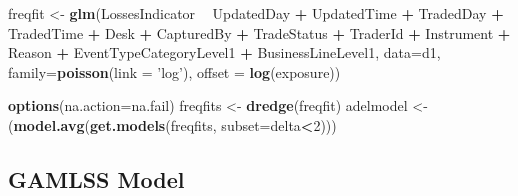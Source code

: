 \documentclass[]{DissertateUSU}
\newenvironment{Shaded}{\begin{snugshade}}{\end{snugshade}}
\newcommand{\KeywordTok}[1]{\textcolor[rgb]{0.13,0.29,0.53}{\textbf{#1}}}
\newcommand{\DataTypeTok}[1]{\textcolor[rgb]{0.13,0.29,0.53}{#1}}
\newcommand{\DecValTok}[1]{\textcolor[rgb]{0.00,0.00,0.81}{#1}}
\newcommand{\StringTok}[1]{\textcolor[rgb]{0.31,0.60,0.02}{#1}}
\newcommand{\OperatorTok}[1]{\textcolor[rgb]{0.81,0.36,0.00}{\textbf{#1}}}
\newcommand{\NormalTok}[1]{#1}
\begin{document}
\begin{Shaded}
\begin{Highlighting}[]
\NormalTok{freqfit <-}\StringTok{ }\KeywordTok{glm}\NormalTok{(LossesIndicator }\OperatorTok{~}\StringTok{ }\NormalTok{UpdatedDay }\OperatorTok{+}\StringTok{ }\NormalTok{UpdatedTime }\OperatorTok{+}\StringTok{ }\NormalTok{TradedDay}
               \OperatorTok{+}\StringTok{ }\NormalTok{TradedTime }\OperatorTok{+}\StringTok{ }\NormalTok{Desk }\OperatorTok{+}\StringTok{ }\NormalTok{CapturedBy }\OperatorTok{+}\StringTok{ }\NormalTok{TradeStatus }\OperatorTok{+}
\StringTok{               }\NormalTok{TraderId }\OperatorTok{+}\StringTok{ }\NormalTok{Instrument }\OperatorTok{+}\StringTok{ }\NormalTok{Reason }\OperatorTok{+}\StringTok{ }
\StringTok{               }\NormalTok{EventTypeCategoryLevel1 }\OperatorTok{+}\StringTok{ }\NormalTok{BusinessLineLevel1, }\DataTypeTok{data=}\NormalTok{d1,}
               \DataTypeTok{family=}\KeywordTok{poisson}\NormalTok{(}\DataTypeTok{link =} \StringTok{'log'}\NormalTok{), }\DataTypeTok{offset =} \KeywordTok{log}\NormalTok{(exposure))}
\end{Highlighting}
\end{Shaded}

\begin{Shaded}
\begin{Highlighting}[]
\KeywordTok{options}\NormalTok{(}\DataTypeTok{na.action=}\NormalTok{na.fail)}
\NormalTok{freqfits <-}\StringTok{ }\KeywordTok{dredge}\NormalTok{(freqfit)}
\NormalTok{adelmodel <-}\StringTok{ }\NormalTok{(}\KeywordTok{model.avg}\NormalTok{(}\KeywordTok{get.models}\NormalTok{(freqfits, }\DataTypeTok{subset=}\NormalTok{delta}\OperatorTok{<}\DecValTok{2}\NormalTok{)))}
\end{Highlighting}
\end{Shaded}

\normalsize

\clearpage

\subsection*{GAMLSS Model}\label{gamlss-model}

\small
\end{document}
